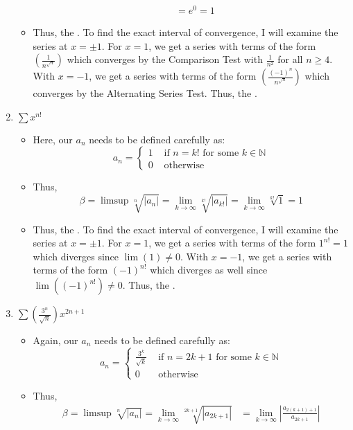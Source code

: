 \documentclass[10pt,a4paper]{article}
\theoremstyle{definition}
\begin{document}
\begin{enumerate}[label = (\alph*)]
\begin{itemize}
\begin{align*}
	&= e^0 = 1
	\end{align*}
	\item Thus, the . To find the exact interval of convergence, I will examine the series at $x = \pm 1$. For $x = 1$, we get a series with terms of the form $\displaystyle \left(\frac{1}{n^{\sqrt{n}}}\right)$ which converges by the Comparison Test with $\frac{1}{n^2}$ for all $n \geq 4$. With $x = -1$, we get a series with terms of the form $\displaystyle \left(\frac{(-1)^n}{n^{\sqrt{n}}}\right)$ which converges by the Alternating Series Test. Thus, the .
	\end{itemize}
\item $\displaystyle \sum x^{n!}$
	\begin{itemize}
	\item Here, our $a_n$ needs to be defined carefully as: \[ a_n = \begin{cases}
	1 &\text{ if } n = k! \text{ for some $k \in \mathbb{N}$}\\
	0 &\text{ otherwise }
	\end{cases}\]
	\item Thus,
	\[\beta = \limsup \sqrt[n]{|a_n|} = \lim_{k \to \infty} \sqrt[k!]{|a_{k!}|} = \lim_{k \to \infty} \sqrt[k!]{1} = 1
	\]
	\item Thus, the . To find the exact interval of convergence, I will examine the series at $x = \pm 1$. For $x = 1$, we get a series with terms of the form $\displaystyle 1^{n!} = 1$ which diverges since $\lim(1) \neq 0$. With $x = -1$, we get a series with terms of the form $\displaystyle (-1)^{n!}$ which diverges as well since $\lim ((-1)^{n!}) \neq 0$. Thus, the .
	\end{itemize}
\item $\displaystyle \sum \left(\frac{3^n}{\sqrt{n}}\right)x^{2n + 1}$
	\begin{itemize}
	\item Again, our $a_n$ needs to be defined carefully as: \[ a_n = \begin{cases}
	\frac{3^k}{\sqrt{k}} &\text{ if } n = 2k + 1 \text{ for some $k \in \mathbb{N}$}\\
	0 &\text{ otherwise }
	\end{cases}\]
	\item Thus,
	\begin{align*}
	\beta = \limsup \sqrt[n]{|a_n|} = \lim_{k \to \infty} \sqrt[2k + 1]{|a_{2k + 1}|} &= \lim_{k \to \infty} \left|\frac{a_{2(k+1) + 1}}{a_{2k+1}}\right|\\

\end{align*}
\end{itemize}
\end{enumerate}
\end{document}
